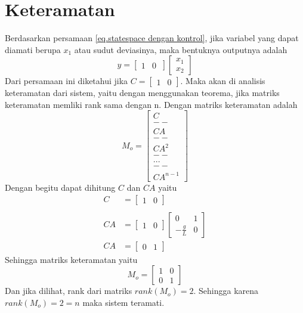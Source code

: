 \documentclass{article}
\begin{document}
\section{Keteramatan}
Berdasarkan persamaan \eqref{eq.statespace dengan kontrol}, jika variabel yang dapat diamati berupa $x_1$ atau sudut deviasinya, maka bentuknya outputnya adalah
\[
    y =
    \begin{bmatrix}
        1 & 0 \
    \end{bmatrix}
    \begin{bmatrix}
        x_1 \\ x_2
    \end{bmatrix}
\]
Dari persamaan ini diketahui jika $C = \begin{bmatrix}
        1 & 0
    \end{bmatrix}$. Maka akan di analisis keteramatan dari sistem, yaitu dengan menggunakan teorema, jika matriks keteramatan memliki rank sama dengan n. Dengan matriks keteramatan adalah
\[
    M_o = \begin{bmatrix}
        C \\ -- \\ CA \\ -- \\ CA^2 \\ -- \\ ... \\ -- \\ CA^{n-1}
    \end{bmatrix}
\]
Dengan begitu dapat dihitung $C$ dan $CA$ yaitu
\begin{align*}
    C  & = \begin{bmatrix} 1 & 0 \end{bmatrix} \\ \\
    CA & = \begin{bmatrix}
               1 & 0
           \end{bmatrix}
    \begin{bmatrix}
        0            & 1 \\
        -\frac{g}{L} & 0
    \end{bmatrix}                       \\
    CA & = \begin{bmatrix}
               0 & 1
           \end{bmatrix}
\end{align*}
Sehingga matriks keteramatan yaitu
\[
    M_o = \begin{bmatrix}
        1 & 0 \\
        0 & 1
    \end{bmatrix}
\]
Dan jika dilihat, rank dari matriks $rank(M_o) = 2$. Sehingga karena $rank(M_o) = 2 = n$ maka sistem teramati.
\end{document}
